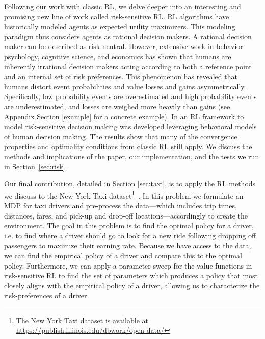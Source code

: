 \documentclass{article}
\begin{document}
Following our work with classic RL, we delve deeper into an interesting and promising new line of work called risk-sensitive RL. RL algorithms have historically modeled agents as expected utility maximizers. This modeling paradigm thus considers agents as rational decision makers. A rational decision maker can be described as risk-neutral. However, extensive work in behavior psychology, cognitive science, and economics has shown that humans are inherently irrational decision makers acting according to both a reference point and an internal set of risk preferences. This phenomenon has revealed that humans distort event probabilities and value losses and gains asymmetrically. Specifically, low probability events are overestimated and high probability events are underestimated, and losses are weighed more heavily than gains (see Appendix Section \ref{example} for a concrete example). In \cite{DBLP:journals/corr/ShenTSO13} an RL framework to model risk-sensitive decision making was developed leveraging behavioral models of human decision making. The results show that many of the convergence properties and optimality conditions from classic RL still apply. We discuss the methods and implications of the paper, our implementation, and the tests we run in Section~\ref{sec:risk}.


Our final contribution, detailed in Section \ref{sec:taxi}, is to apply the RL methods we discuss to the New York Taxi dataset\footnote{The New York Taxi dataset is available at \url{https://publish.illinois.edu/dbwork/open-data/}}~\cite{donovan2014new}. In this problem we formulate an MDP for taxi drivers and pre-process the data---which includes trip times, distances, fares, and pick-up and drop-off locations---accordingly to create the environment. The goal in this problem is to find the optimal policy for a driver, i.e. to find where a driver should go to look for a new ride following dropping off passengers to maximize their earning rate. Because we have access to the data, we can find the empirical policy of a driver and compare this to the optimal policy. Furthermore, we can apply a parameter sweep for the value functions in risk-sensitive RL to find the set of parameters which produces a policy that most closely aligns with the empirical policy of a driver, allowing us to characterize the risk-preferences of a driver.
\end{document}
